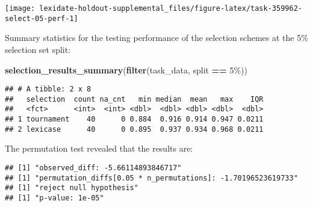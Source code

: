 \documentclass[
]{book}
\newenvironment{Shaded}{\begin{snugshade}}{\end{snugshade}}
\newcommand{\AttributeTok}[1]{\textcolor[rgb]{0.13,0.29,0.53}{#1}}
\newcommand{\DecValTok}[1]{\textcolor[rgb]{0.00,0.00,0.81}{#1}}
\newcommand{\FunctionTok}[1]{\textcolor[rgb]{0.13,0.29,0.53}{\textbf{#1}}}
\newcommand{\NormalTok}[1]{#1}
\newcommand{\OtherTok}[1]{\textcolor[rgb]{0.56,0.35,0.01}{#1}}
\newcommand{\SpecialCharTok}[1]{\textcolor[rgb]{0.81,0.36,0.00}{\textbf{#1}}}
\newcommand{\StringTok}[1]{\textcolor[rgb]{0.31,0.60,0.02}{#1}}
\begin{document}
\texttt{[image: lexidate-holdout-supplemental\_files/figure-latex/task-359962-select-05-perf-1]}

Summary statistics for the testing performance of the selection schemes at the 5\% selection set split:

\begin{Shaded}
\begin{Highlighting}[]
\FunctionTok{selection\_results\_summary}\NormalTok{(}\FunctionTok{filter}\NormalTok{(task\_data, split }\SpecialCharTok{==} \StringTok{\textquotesingle{}5\%\textquotesingle{}}\NormalTok{))}
\end{Highlighting}
\end{Shaded}

\begin{verbatim}
## # A tibble: 2 x 8
##   selection  count na_cnt   min median  mean   max    IQR
##   <fct>      <int>  <int> <dbl>  <dbl> <dbl> <dbl>  <dbl>
## 1 tournament    40      0 0.884  0.916 0.914 0.947 0.0211
## 2 lexicase      40      0 0.895  0.937 0.934 0.968 0.0211
\end{verbatim}

The permutation test revealed that the results are:

\begin{Shaded}
\end{Shaded}

\begin{verbatim}
## [1] "observed_diff: -5.66114893846717"
## [1] "permutation_diffs[0.05 * n_permutations]: -1.70196523619733"
## [1] "reject null hypothesis"
## [1] "p-value: 1e-05"
\end{verbatim}
\end{document}
